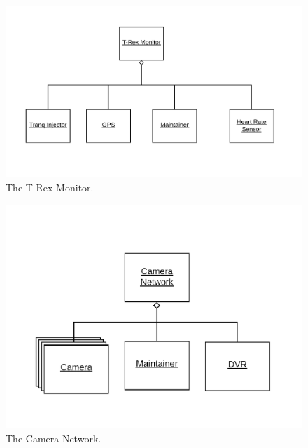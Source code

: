 \documentclass[12pt]{article}
\begin{document}
\begin{figure}[H]
    \centerline{\includegraphics[scale=.20]{TRexMonitor.png}}
    \caption{The T-Rex Monitor.}
    \label{fig:TRexMonitor}
\end{figure}

\begin{figure}[H]
    \centerline{\includegraphics[scale=.20]{CameraNetwork.png}}
    \caption{The Camera Network.}
    \label{fig:CameraNetwork}
\end{figure}    
\end{document}
